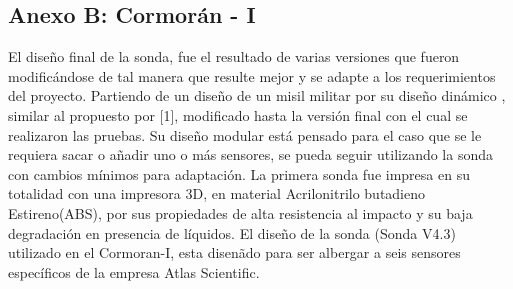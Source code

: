 \appendixpageoff
\begin{appendices}







\chapter*{Anexo B: Cormor\'an - I}
\label{appendix: cormoran}
\setcounter{figure}{0}    

El diseño final de la sonda, fue el resultado de varias versiones que fueron modificándose de tal manera que resulte mejor y se adapte a los requerimientos del proyecto.
Partiendo de un diseño de un misil militar por su dise\~no din\'amico , similar al propuesto por [1], modificado hasta la versión final con el cual se realizaron las pruebas. Su diseño modular est\'a pensado para el caso que se le requiera sacar o añadir uno o m\'as sensores, se pueda seguir utilizando la sonda con cambios mínimos para adaptación.
La primera sonda fue impresa en su totalidad con una impresora 3D, en material Acrilonitrilo butadieno Estireno(ABS), por sus propiedades de alta resistencia al impacto y su baja degradación en presencia de líquidos. 
El diseño de la sonda (Sonda V4.3) utilizado en el Cormoran-I, esta disen\~ado para ser albergar a seis sensores específicos de la empresa Atlas Scientific.


\end{appendices}
